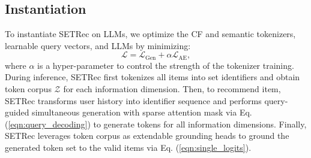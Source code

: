 





\subsection{Instantiation}
To instantiate SETRec on LLMs, we optimize the CF and semantic tokenizers, learnable query vectors, and LLMs by minimizing: 
\begin{equation}\label{eqn:overall_loss}
    \mathcal{L} = \mathcal{L}_{\text{Gen}} + \alpha \mathcal{L}_{\text{AE}},
\end{equation}
where $\alpha$ is a hyper-parameter to control the strength of the tokenizer training. 
During inference, SETRec first tokenizes all items into set identifiers and obtain token corpus $\mathcal{Z}$ for each information dimension. 
Then, to recommend item, SETRec transforms user history into identifier sequence and performs query-guided simultaneous generation with sparse attention mask via Eq. (\ref{eqn:query_decoding}) to generate tokens for all information dimensions.  
Finally, SETRec leverages token corpus as extendable grounding heads to ground the generated token set to the valid items via Eq. (\ref{eqn:single_logits}). 

